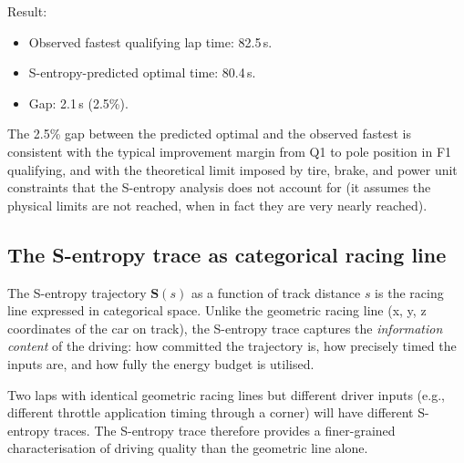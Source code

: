 \documentclass[twocolumn,10pt,a4paper]{article}
\theoremstyle{definition}
\theoremstyle{remark}
\newcommand{\Sent}{\mathbf{S}}
\begin{document}
Result:
\begin{itemize}
    \item Observed fastest qualifying lap time: 82.5\,s.
    \item S-entropy-predicted optimal time: 80.4\,s.
    \item Gap: 2.1\,s (2.5\%).
\end{itemize}

The 2.5\% gap between the predicted optimal and the observed fastest is consistent with the typical improvement margin from Q1 to pole position in F1 qualifying, and with the theoretical limit imposed by tire, brake, and power unit constraints that the S-entropy analysis does not account for (it assumes the physical limits are not reached, when in fact they are very nearly reached).

\subsection{The S-entropy trace as categorical racing line}

The S-entropy trajectory $\Sent(s)$ as a function of track distance $s$ is the racing line expressed in categorical space. Unlike the geometric racing line (x, y, z coordinates of the car on track), the S-entropy trace captures the \emph{information content} of the driving: how committed the trajectory is, how precisely timed the inputs are, and how fully the energy budget is utilised.

Two laps with identical geometric racing lines but different driver inputs (e.g., different throttle application timing through a corner) will have different S-entropy traces. The S-entropy trace therefore provides a finer-grained characterisation of driving quality than the geometric line alone.
\end{document}
